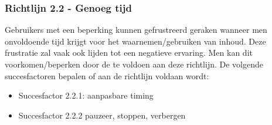 \subsubsection{Richtlijn 2.2 - Genoeg tijd}
Gebruikers met een beperking kunnen gefrustreerd geraken wanneer men onvoldoende tijd krijgt voor het waarnemen/gebruiken van inhoud. Deze frustratie zal vaak ook lijden tot een negatieve ervaring. Men kan dit voorkomen/beperken door de te voldoen aan deze richtlijn. De volgende succesfactoren bepalen of aan de richtlijn voldaan wordt: \begin{itemize}
    \item Succesfactor 2.2.1: aanpasbare timing
    \item Succesfactor 2.2.2 pauzeer, stoppen, verbergen
\end{itemize}

